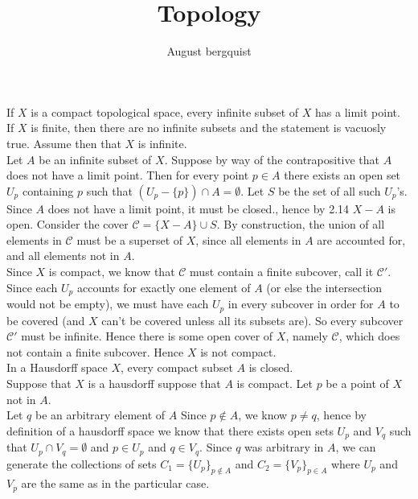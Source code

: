 \documentclass{article}
\title{Topology}
\author{August bergquist}
\begin{document}
 If $X$ is a compact topological space, every infinite subset of $X$ has a limit point.\\

 If $X$ is finite, then there are no infinite subsets and the statement is vacuosly true. Assume then that $X$ is infinite.\\

Let $A$ be an infinite subset of $X$. Suppose by way of the contrapositive that $A$ does not have a limit point. Then for every point $p\in A$ there exists an open set $U_p$ containing $p$ such that $(U_p-\{p\})\cap A = \emptyset$. Let $S$ be the set of all such $U_p$'s.\\

Since $A$ does not have a limit point, it must be closed., hence by 2.14 $X-A$ is open. Consider the cover $\mathcal{C} = \{X-A\}\cup S$. By construction, the union of all elements in $\mathcal{C}$ must be a superset of $X$, since all elements in $A$ are accounted for, and all elements not in $A$.\\

Since $X$ is compact, we know that $\mathcal{C}$ must contain a finite subcover, call it $\mathcal{C}'$. Since each $U_p$ accounts for exactly one element of $A$ (or else the intersection would not be empty), we must have each $U_p$ in every subcover in order for $A$ to be covered (and $X$ can't be covered unless all its subsets are). So every subcover $\mathcal{C}'$ must be infinite. Hence there is some open cover of $X$, namely $\mathcal{C}$, which does not contain a finite subcover. Hence $X$ is not compact.\\

 In a Hausdorff space $X$, every compact subset $A$ is closed.\\

 Suppose that $X$ is a hausdorff suppose that $A$ is compact. Let $p$ be a point of $X$ not in $A$.\\

Let $q$ be an arbitrary element of $A$ Since $p\not\in A$, we know $p\ne q$, hence by definition of a hausdorff space we know that there exists open sets $U_p$ and $V_q$ such that $U_p\cap V_q = \emptyset$ and $p\in U_p $ and $q\in V_q$. Since $q$ was arbitrary in $A$, we can generate the collections of sets $C_1 = \{U_p\}_{p\not\in A}$ and $C_2= \{V_p\}_{p\in A}$ where $U_p$ and $V_p$ are the same as in the particular case.\\
\end{document}
